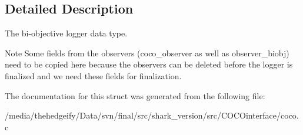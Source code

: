\subsection{Detailed Description}
The bi-\/objective logger data type. 

\begin{DoxyNote}{Note}
Some fields from the observers (coco\+\_\+observer as well as observer\+\_\+biobj) need to be copied here because the observers can be deleted before the logger is finalized and we need these fields for finalization. 
\end{DoxyNote}


The documentation for this struct was generated from the following file\+:\begin{DoxyCompactItemize}
\item 
/media/thehedgeify/\+Data/svn/final/src/shark\+\_\+version/src/\+C\+O\+C\+Ointerface/coco.\+c\end{DoxyCompactItemize}
